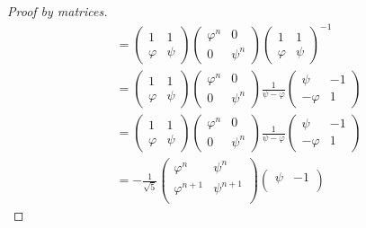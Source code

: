 \begin{proof}[Proof by matrices]
\begin{align*}
        &=
        \begin{pmatrix}
            1 & 1 \\
            \varphi & \psi
        \end{pmatrix}
        \begin{pmatrix}
            \varphi^n & 0 \\
            0 & \psi^n
        \end{pmatrix}
        \begin{pmatrix}
            1 & 1 \\
            \varphi & \psi
        \end{pmatrix}^{-1} \\
        &=
        \begin{pmatrix}
            1 & 1 \\
            \varphi & \psi
        \end{pmatrix}
        \begin{pmatrix}
            \varphi^n & 0 \\
            0 & \psi^n
        \end{pmatrix}
        \frac 1 {\psi - \varphi}
        \begin{pmatrix}
            \psi & -1 \\
            -\varphi & 1
        \end{pmatrix} \\
        &=
        \begin{pmatrix}
            1 & 1 \\
            \varphi & \psi
        \end{pmatrix}
        \begin{pmatrix}
            \varphi^n & 0 \\
            0 & \psi^n
        \end{pmatrix}
        \frac 1 {\psi - \varphi}
        \begin{pmatrix}
            \psi & -1 \\
            -\varphi & 1
        \end{pmatrix} \\
        &=
        -\frac 1 {\sqrt 5}
        \begin{pmatrix}
            \varphi^n & \psi^n \\
            \varphi^{n + 1} & \psi^{n + 1} \\
        \end{pmatrix}
        \begin{pmatrix}
            \psi & -1 \\

\end{pmatrix}
\end{align*}
\end{proof}
